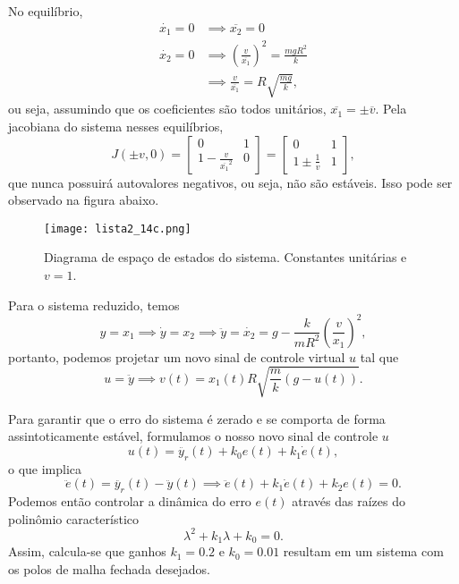 \documentclass[a4paper]{report}
\begin{document}
No equilíbrio,
\begin{align*}
    \dot{x_1} = 0 &\implies \overline{x_2} = 0 \\
    \dot{x_2} = 0 &\implies \left( \frac{v}{\overline{x_1}} \right)^2 = \frac{mgR^2}{k} \\
		  &\implies \frac{v}{\overline{x_1}} = R \sqrt{\frac{mg}{k}} 
,\end{align*}
ou seja, assumindo que os coeficientes são todos unitários, $\overline{x_1} = \pm \overline{v}$. Pela jacobiana do sistema nesses equilíbrios, \[
    J(\pm v, 0) = \begin{bmatrix}
    0 & 1 \\
    1-\frac{v}{\overline{x_1}^2} & 0
\end{bmatrix} = \begin{bmatrix} 
    0 & 1 \\
    1 \pm \frac{1}{v} & 1
\end{bmatrix}
,\] que nunca possuirá autovalores negativos, ou seja, não são estáveis. Isso pode ser observado na figura abaixo.

\begin{figure}[H]
    \centering
    \texttt{[image: lista2\_14c.png]}
    \caption{Diagrama de espaço de estados do sistema. Constantes unitárias e $v=1$.}
    \label{fig:lista2_14c-png}
\end{figure}



Para o sistema reduzido, temos \[
y = x_1 \implies \dot{y} = x_2 \implies \ddot{y} = \dot{x_2} = g - \frac{k}{mR^2}\left( \frac{v}{x_1} \right)^2
,\] portanto, podemos projetar um novo sinal de controle virtual $u$ tal que \[
u = \ddot{y} \implies v(t) = x_1(t) R \sqrt{\frac{m}{k}\left( g-u(t) \right) } 
.\]


Para garantir que o erro do sistema é zerado e se comporta de forma assintoticamente estável, formulamos o nosso novo sinal de controle $u$ \[
u(t) = \ddot{y_r}(t) + k_0e(t) + k_1\dot{e}(t)
,\] o que implica \[
\ddot{e}(t) = \ddot{y_r}(t) - \ddot{y}(t) \implies \ddot{e}(t) + k_1\dot{e}(t) + k_2e(t) = 0
.\] Podemos então controlar a dinâmica do erro $e(t)$ através das raízes do polinômio característico \[
\lambda^2 + k_1 \lambda + k_0 = 0
.\] Assim, calcula-se que ganhos $k_1=0.2$ e $k_0=0.01$ resultam em um sistema com os polos de malha fechada desejados.

\end{document}
